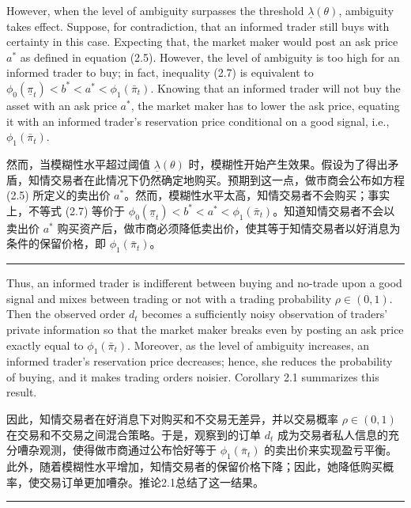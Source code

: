 \documentclass[12pt,a4paper]{article}
\newenvironment{original}{%
  \par\vspace{4pt}\noindent%
  \color{black}%
  \ignorespaces
}{%
  \par\vspace{2pt}%
}
\newenvironment{translation}{%
  \par\vspace{2pt}\noindent%
  \color{transblue}%
  \ignorespaces
}{%
  \par\vspace{4pt}\hrule\vspace{6pt}%
}
\begin{document}
\begin{original}
However, when the level of ambiguity surpasses the threshold $\underline{\lambda}(\theta)$, ambiguity takes effect. Suppose, for contradiction, that an informed trader still buys with certainty in this case. Expecting that, the market maker would post an ask price $a^*$ as defined in equation (2.5). However, the level of ambiguity is too high for an informed trader to buy; in fact, inequality (2.7) is equivalent to $\phi_0(\underline{\pi}_t) < b^* < a^* < \phi_1(\bar{\pi}_t)$. Knowing that an informed trader will not buy the asset with an ask price $a^*$, the market maker has to lower the ask price, equating it with an informed trader's reservation price conditional on a good signal, i.e., $\phi_1(\bar{\pi}_t)$.
\end{original}
\begin{translation}
然而，当模糊性水平超过阈值 $\underline{\lambda}(\theta)$ 时，模糊性开始产生效果。假设为了得出矛盾，知情交易者在此情况下仍然确定地购买。预期到这一点，做市商会公布如方程 (2.5) 所定义的卖出价 $a^*$。然而，模糊性水平太高，知情交易者不会购买；事实上，不等式 (2.7) 等价于 $\phi_0(\underline{\pi}_t) < b^* < a^* < \phi_1(\bar{\pi}_t)$。知道知情交易者不会以卖出价 $a^*$ 购买资产后，做市商必须降低卖出价，使其等于知情交易者以好消息为条件的保留价格，即 $\phi_1(\bar{\pi}_t)$。
\end{translation}

\begin{original}
Thus, an informed trader is indifferent between buying and no-trade upon a good signal and mixes between trading or not with a trading probability $\rho \in (0, 1)$. Then the observed order $d_t$ becomes a sufficiently noisy observation of traders' private information so that the market maker breaks even by posting an ask price exactly equal to $\phi_1(\bar{\pi}_t)$. Moreover, as the level of ambiguity increases, an informed trader's reservation price decreases; hence, she reduces the probability of buying, and it makes trading orders noisier. Corollary 2.1 summarizes this result.
\end{original}
\begin{translation}
因此，知情交易者在好消息下对购买和不交易无差异，并以交易概率 $\rho \in (0, 1)$ 在交易和不交易之间混合策略。于是，观察到的订单 $d_t$ 成为交易者私人信息的充分嘈杂观测，使得做市商通过公布恰好等于 $\phi_1(\bar{\pi}_t)$ 的卖出价来实现盈亏平衡。此外，随着模糊性水平增加，知情交易者的保留价格下降；因此，她降低购买概率，使交易订单更加嘈杂。推论2.1总结了这一结果。
\end{translation}
\end{document}
